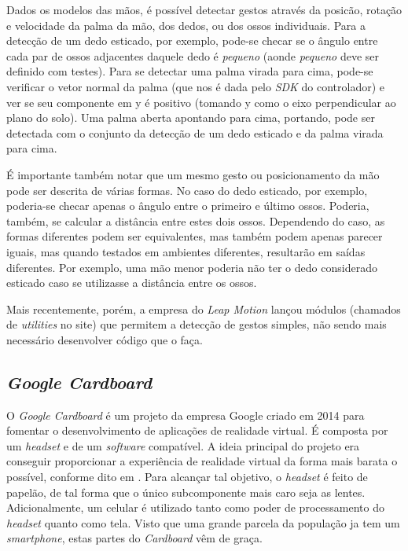 Dados os modelos das mãos, é possível detectar gestos através 
da posicão, rotação e velocidade da palma da mão, dos dedos, 
ou dos ossos individuais. Para a detecção de um dedo 
esticado, por exemplo, pode-se checar se o ângulo entre 
cada par de ossos adjacentes daquele dedo é \textit{pequeno} 
(aonde \textit{pequeno} deve ser definido com testes). 
Para se detectar uma palma virada para cima, pode-se 
verificar o vetor normal da palma (que nos é dada pelo 
\textit{SDK} do controlador) e ver se seu componente em 
y é positivo (tomando y como o eixo perpendicular ao 
plano do solo). Uma palma aberta apontando para cima, 
portando, pode ser detectada com o conjunto da detecção 
de um dedo esticado e da palma virada para cima.

É importante também notar que um mesmo gesto ou posicionamento
da mão pode ser descrita de várias formas. No caso do dedo esticado, 
por exemplo, poderia-se checar apenas o ângulo entre o primeiro e 
último ossos. Poderia, também, se calcular a distância entre estes
dois ossos. Dependendo do caso, as formas diferentes podem ser 
equivalentes, mas também podem apenas parecer iguais, mas quando
testados em ambientes diferentes, resultarão em saídas diferentes.
Por exemplo, uma mão menor poderia não ter o dedo considerado esticado
caso se utilizasse a distância entre os ossos.

Mais recentemente, porém, a empresa do \textit{Leap Motion} 
lançou módulos (chamados de \textit{utilities} no site) 
que permitem a detecção de gestos simples, não sendo 
mais necessário desenvolver código que o faça.

\subsection{\textit{Google Cardboard}}\label{subsec-teo-google-cardboard}

O \textit{Google Cardboard} é um projeto da empresa Google criado em 2014 para 
fomentar o desenvolvimento de aplicações de realidade virtual. É composta por um 
\textit{headset} e de um \textit{software} compatível. A ideia principal do projeto era
conseguir proporcionar a experiência de realidade virtual da forma mais barata 
o possível, conforme dito em \cite{cnet:2016:google-cardboard}. Para 
alcançar tal objetivo, o \textit{headset} é feito de papelão, 
de tal forma que o único subcomponente mais caro seja as lentes. Adicionalmente, 
um celular é utilizado tanto como poder de processamento do \textit{headset} 
quanto como tela. Visto que uma grande parcela da população ja tem um 
\textit{smartphone}, estas partes do \textit{Cardboard} vêm de graça.

